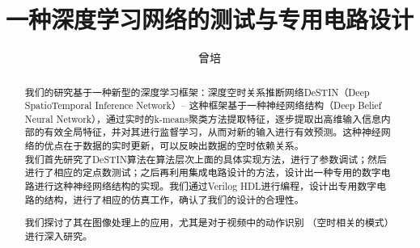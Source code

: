 \documentclass[winfonts]{njuthesis}
\title{一种深度学习网络的测试与专用电路设计}
\author{曾培}
\begin{document}


\maketitle
\makeenglishtitle

\begin{abstract}
我们的研究基于一种新型的深度学习框架：深度空时关系推断网络DeSTIN（Deep SpatioTemporal Inference Network）-- 这种框架基于一种神经网络结构（Deep Belief Neural Network），通过实时的k-means聚类方法提取特征，逐步提取出高维输入信息内部的有效全局特征，并对其进行监督学习，从而对新的输入进行有效预测。这种神经网络的优点在于数据的实时更新，可以反映出数据的空时依赖关系。\\

我们首先研究了DeSTIN算法在算法层次上面的具体实现方法，进行了参数调试；然后进行了相应的定点数测试；之后再利用集成电路设计的方法，设计出一种专用的数字电路进行这种神经网络结构的实现。我们通过Verilog HDL进行编程，设计出专用数字电路的结构，进行了相应的仿真工作，确认了我们的设计的合理性。 

我们探讨了其在图像处理上的应用，尤其是对于视频中的动作识别 （空时相关的模式）进行深入研究。


\end{abstract}
\end{document}
